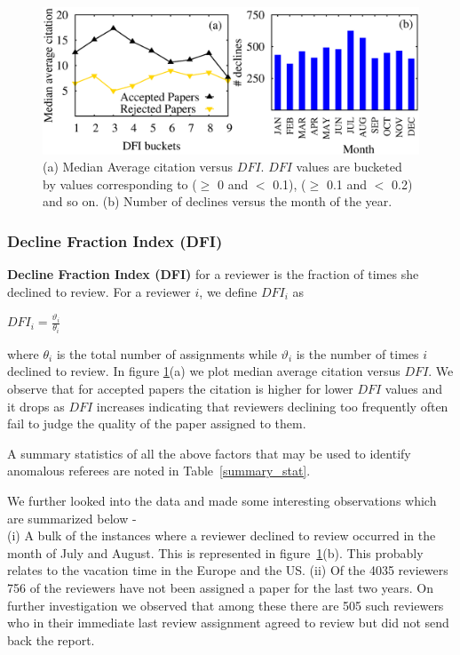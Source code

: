 \begin{figure}
\centering
\includegraphics[scale=0.3]{figures/DFI_dec_month.eps}
\caption{\label{fig_dfi}(a) Median Average citation versus $DFI$. $DFI$ values are bucketed by values corresponding to ($\geq$ 0 and $<$ 0.1), ($\geq$ 0.1 and $<$ 0.2) and so on. (b) Number of declines versus the month of the year.}
\vspace{-.4cm}
\end{figure}

\subsubsection{Decline Fraction Index (DFI)}

{\bf Decline Fraction Index (DFI)} for a reviewer is the fraction of times she declined to review. For a reviewer $i$, we define $DFI_{i}$ as
\begin{center}
$DFI_{i}=\frac{\vartheta_{i}}{\theta_{i}}$
\end{center}

\noindent where $\theta_{i}$ is the total number of assignments while $\vartheta_{i}$ is the number of times $i$ declined to review. 
In figure \ref{fig_dfi}(a) we plot median average citation versus $DFI$. We observe that for accepted papers the citation is higher for lower $DFI$ values and it drops as $DFI$ increases indicating that reviewers declining too frequently often fail to judge the quality of the paper assigned to them.

A summary statistics of all the above factors that may be used to identify anomalous referees are noted in Table~\ref{summary_stat}.

We further looked into the data and made some interesting observations which are summarized below - \\
(i) A bulk of the instances where a reviewer declined to review occurred in the month of July and August. This is represented in figure~\ref{fig_dfi}(b). This probably relates to the vacation time in the Europe and the US.
(ii) Of the 4035 reviewers 756 of the reviewers have not been assigned a paper for the last two years. On further investigation we observed that among these there are 505 such reviewers who in their immediate last review assignment agreed to review but did not send back the report.  \\